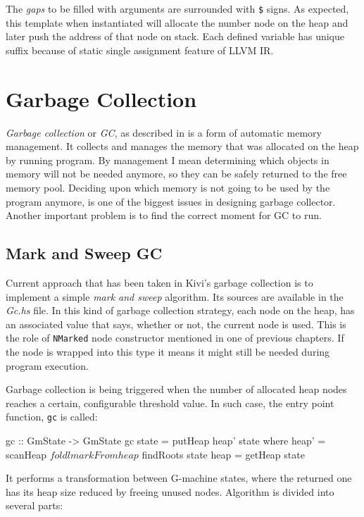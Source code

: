 \documentclass[12pt,a4paper]{report}
\begin{document}
The \textit{gaps} to be filled with arguments are surrounded with \texttt{\$}
signs. As expected, this template when instantiated will allocate the number
node on the heap and later push the address of that node on stack. Each defined
variable has unique suffix because of static single assignment feature of LLVM
IR.


\section{Garbage Collection}
\label{sec:garbage_collection}
\textit{Garbage collection} or \textit{GC}, as described in
\cite{wiki:garbage_collection} is a form of automatic memory management. It
collects and manages the memory that was allocated on the heap by running
program. By management I mean determining which objects in memory will not be
needed anymore, so they can be safely returned to the free memory pool.
Deciding upon which memory is not going to be used by the program anymore, is
one of the biggest issues in designing garbage collector. Another important
problem is to find the correct moment for GC to run.

\subsection{Mark and Sweep GC}
Current approach that has been taken in Kivi's garbage collection is to
implement a simple \textit{mark and sweep} algorithm. Its sources are
available in the \textit{Gc.hs} file. In this kind of garbage collection
strategy, each node on the heap, has an associated value that says, whether or
not, the current node is used. This is the role of \texttt{NMarked} node
constructor mentioned in one of previous chapters. If the node is wrapped into
this type it means it might still be needed during program execution.

Garbage collection is being triggered when the number of allocated heap nodes
reaches a certain, configurable threshold value. In such case, the entry point
function, \texttt{gc} is called:

\vspace*{0.2in}

\begin{code}[style=haskell]
  gc :: GmState -> GmState
  gc state = putHeap heap' state
      where
          heap' = scanHeap $ foldl markFrom heap $ findRoots state
          heap = getHeap state
\end{code}

It performs a transformation between G-machine states, where the returned one
has its heap size reduced by freeing unused nodes. Algorithm is divided into
several parts:
\end{document}
